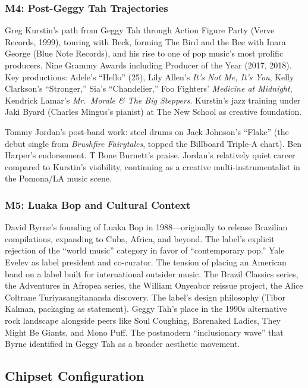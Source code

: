 \documentclass[11pt,letterpaper]{article}
\begin{document}
\subsubsection{M4: Post-Geggy Tah Trajectories}

Greg Kurstin's path from Geggy Tah through Action Figure Party (Verve Records, 1999), touring with Beck, forming The Bird and the Bee with Inara George (Blue Note Records), and his rise to one of pop music's most prolific producers. Nine Grammy Awards including Producer of the Year (2017, 2018). Key productions: Adele's ``Hello'' (25), Lily Allen's \textit{It's Not Me, It's You}, Kelly Clarkson's ``Stronger,'' Sia's ``Chandelier,'' Foo Fighters' \textit{Medicine at Midnight}, Kendrick Lamar's \textit{Mr.\ Morale \& The Big Steppers}. Kurstin's jazz training under Jaki Byard (Charles Mingus's pianist) at The New School as creative foundation.

Tommy Jordan's post-band work: steel drums on Jack Johnson's ``Flake'' (the debut single from \textit{Brushfire Fairytales}, topped the Billboard Triple-A chart). Ben Harper's endorsement. T Bone Burnett's praise. Jordan's relatively quiet career compared to Kurstin's visibility, continuing as a creative multi-instrumentalist in the Pomona/LA music scene.

\subsubsection{M5: Luaka Bop and Cultural Context}

David Byrne's founding of Luaka Bop in 1988---originally to release Brazilian compilations, expanding to Cuba, Africa, and beyond. The label's explicit rejection of the ``world music'' category in favor of ``contemporary pop.'' Yale Evelev as label president and co-curator. The tension of placing an American band on a label built for international outsider music. The Brazil Classics series, the Adventures in Afropea series, the William Onyeabor reissue project, the Alice Coltrane Turiyasangitananda discovery. The label's design philosophy (Tibor Kalman, packaging as statement). Geggy Tah's place in the 1990s alternative rock landscape alongside peers like Soul Coughing, Barenaked Ladies, They Might Be Giants, and Mono Puff. The postmodern ``inclusionary wave'' that Byrne identified in Geggy Tah as a broader aesthetic movement.

\subsection{Chipset Configuration}
\end{document}
